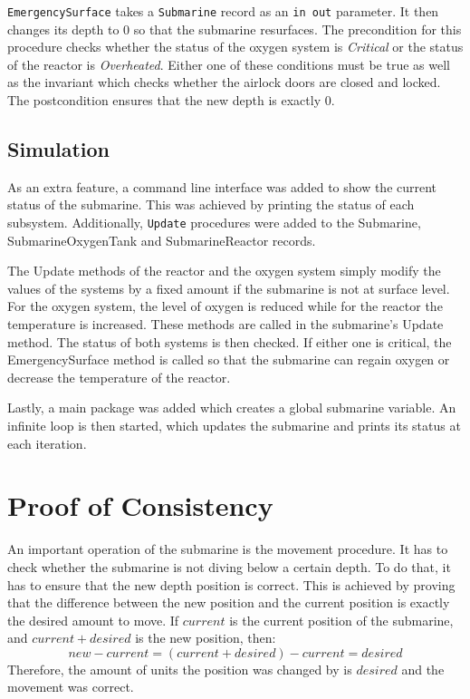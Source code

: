\documentclass{llncs}
\begin{document}
\texttt{EmergencySurface} takes a \texttt{Submarine} record as an \texttt{in out} parameter. It then changes its depth to 0 so that the submarine resurfaces. The precondition for this procedure checks whether the status of the oxygen system is \textit{Critical} or the status of the reactor is \textit{Overheated}. Either one of these conditions must be true as well as the invariant which checks whether the airlock doors are closed and locked. The postcondition ensures that the new depth is exactly 0. 

\subsection{Simulation}
As an extra feature, a command line interface was added to show the current status of the submarine. This was achieved by printing the status of each subsystem. Additionally, \texttt{Update} procedures were added to the Submarine, SubmarineOxygenTank and SubmarineReactor records. 

The Update methods of the reactor and the oxygen system simply modify the values of the systems by a fixed amount if the submarine is not at surface level. For the oxygen system, the level of oxygen is reduced while for the reactor the temperature is increased. These methods are called in the submarine's Update method. The status of both systems is then checked. If either one is critical, the EmergencySurface method is called so that the submarine can regain oxygen or decrease the temperature of the reactor. 

Lastly, a main package was added which creates a global submarine variable. An infinite loop is then started, which updates the submarine and prints its status at each iteration.

\section{Proof of Consistency}
An important operation of the submarine is the movement procedure. It has to check whether the submarine is not diving below a certain depth. To do that, it has to ensure that the new depth position is correct. This is achieved by proving that the difference between the new position and the current position is exactly the desired amount to move. If $current$ is the current position of the submarine, and $current + desired$ is the new position, then:
\[
new - current = (current + desired) - current = desired
\]
Therefore, the amount of units the position was changed by is $desired$ and the movement was correct.
\end{document}
